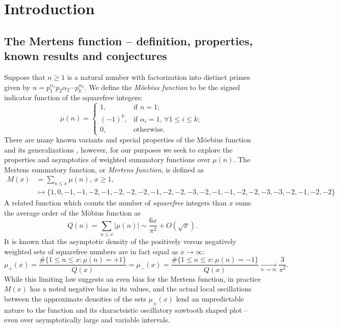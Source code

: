 \documentclass[11pt,reqno,a4letter]{article}
\numberwithin{figure}{section}
\numberwithin{table}{section}
\newcommand{\cf}{\textit{cf.\ }}
\newcommand{\seqnum}[1]{\href{http://oeis.org/#1}{\color{ProcessBlue}{\underline{#1}}}}
\theoremstyle{plain}
\numberwithin{theorem}{section}
\theoremstyle{definition}
\begin{document}
     \vskip -0.35in
     \printglossary[type={symbols},title={},style={glossstyleSymbol},nogroupskip=true]

\newpage
\section{Introduction} 

\subsection{The Mertens function -- definition, properties, known results and conjectures} 
\label{subSection_MertensMxClassical_Intro} 

Suppose that $n \geq 1$ is a natural number with factorization into 
distinct primes given by 
$n = p_1^{\alpha_1} p_2{\alpha_2} \cdots p_k^{\alpha_k}$. 
We define the \emph{M\"oebius function} to be the signed indicator function 
of the squarefree integers: 
\[
\mu(n) = \begin{cases} 
     1, & \text{if $n = 1$; } \\ 
     (-1)^k, & \text{if $\alpha_i = 1$, $\forall 1 \leq i \leq k$; } \\ 
     0, & \text{otherwise.} 
     \end{cases} 
\]
There are many known variants and special properties of the M\"oebius function 
and its generalizations \cite[\cf \S 2]{HANDBOOKNT-2004}, however, for our 
purposes we seek to explore the properties and asymptotics of weighted 
summatory functions over $\mu(n)$. 
The Mertens summatory function, or \emph{Mertens function}, is defined as 
\cite[\seqnum{A002321}]{OEIS} 
\begin{align*} 
M(x) & = \sum_{n \leq x} \mu(n),\ x \geq 1, \\ 
     & \longmapsto \{1, 0, -1, -1, -2, -1, -2, -2, -2, -1, -2, -2, -3, -2, 
     -1, -1, -2, -2, -3, -3, -2, -1, -2, -2\}
\end{align*} 
A related function which counts the 
number of \emph{squarefree} integers than $x$ sums the average order of the M\"obius function as 
\cite[\seqnum{A013928}]{OEIS} 
\[ 
Q(n) = \sum_{n \leq x} |\mu(n)| \sim \frac{6x}{\pi^2} + O\left(\sqrt{x}\right). 
\] 
It is known that the asymptotic density of the positively versus negatively 
weighted sets of squarefree numbers are in fact equal as $x \rightarrow \infty$: 
\[
\mu_{+}(x) = \frac{\#\{1 \leq n \leq x: \mu(n) = +1\}}{Q(x)} = 
     \mu_{-}(x) = \frac{\#\{1 \leq n \leq x: \mu(n) = -1\}}{Q(x)} 
     \xrightarrow[n \rightarrow \infty]{} \frac{3}{\pi^2}. 
\]
While this limiting law suggests an even bias for the Mertens function, 
in practice $M(x)$ has a noted negative bias in its values, and the actual 
local oscillations between the approximate densities of the sets 
$\mu_{\pm}(x)$ lend an unpredictable nature to the function and its 
characteistic oscillatory sawtooth shaped plot -- even over asymptotically 
large and variable intervals.
\end{document}
